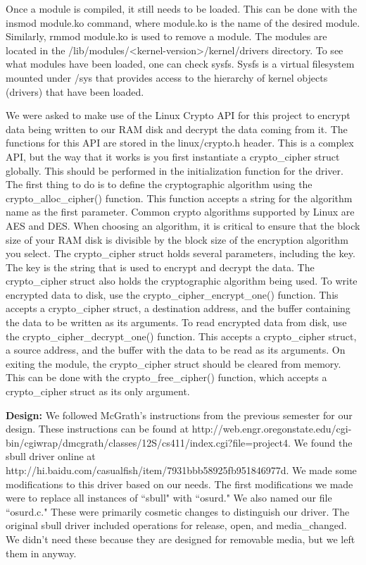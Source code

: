 \documentclass[letterpaper,10pt,titlepage]{article}
\newcommand{\tab}{\hspace*{2em}} %
\begin{document}
\begin{enumerate}
\tab Once a module is compiled, it still needs to be loaded. This can be done with the insmod module.ko command, where module.ko is the name of the desired module. Similarly, rmmod module.ko is used to remove a module. The modules are located in the /lib/modules/<kernel-version>/kernel/drivers directory. To see what modules have been loaded, one can check sysfs. Sysfs is a virtual filesystem mounted under /sys that provides access to the hierarchy of kernel objects (drivers) that have been loaded.

\tab We were asked to make use of the Linux Crypto API for this project to encrypt data being written to our RAM disk and decrypt the data coming from it. The functions for this API are stored in the linux/crypto.h header. This is a complex API, but the way that it works is you first instantiate a crypto_cipher struct globally. This should be performed in the initialization function for the driver. The first thing to do is to define the cryptographic algorithm using the crypto_alloc_cipher() function. This function accepts a string for the algorithm name as the first parameter. Common crypto algorithms supported by Linux are AES and DES. When choosing an algorithm, it is critical to ensure that the block size of your RAM disk is divisible by the block size of the encryption algorithm you select. The crypto_cipher struct holds several parameters, including the key. The key is the string that is used to encrypt and decrypt the data. The crypto_cipher struct also holds the cryptographic algorithm being used. To write encrypted data to disk, use the crypto_cipher_encrypt_one() function. This accepts a crypto_cipher struct, a destination address, and the buffer containing the data to be written as its arguments. To read encrypted data from disk, use the crypto_cipher_decrypt_one() function. This accepts a crypto_cipher struct, a source address, and the buffer with the data to be read as its arguments. On exiting the module, the crypto_cipher struct should be cleared from memory. This can be done with the crypto_free_cipher() function, which accepts a crypto_cipher struct as its only argument. 

\tab \textbf{Design:} 
\tab We followed McGrath's instructions from the previous semester for our design. These instructions can be found at http://web.engr.oregonstate.edu/cgi-bin/cgiwrap/dmcgrath/classes/12S/cs411/index.cgi?file=project4. We found the sbull driver online at http://hi.baidu.com/casualfish/item/7931bbb58925fb951846977d. We made some modifications to this driver based on our needs. The first modifications we made were to replace all instances of ``sbull" with ``osurd." We also named our file ``osurd.c." These were primarily cosmetic changes to distinguish our driver. The original sbull driver included operations for release, open, and media_changed. We didn't need these because they are designed for removable media, but we left them in anyway. 


\end{enumerate}
\end{document}
